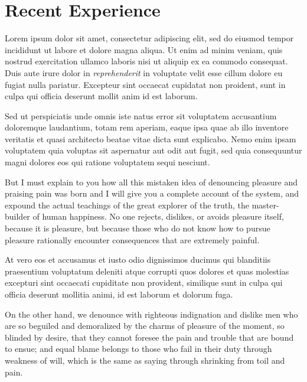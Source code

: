 \documentclass[]{resume}
\begin{document}
\begin{minipage}[t]{0.66\textwidth} 
	\section{Recent Experience} 
		Lorem ipsum dolor sit amet, consectetur adipiscing elit, sed do eiusmod tempor incididunt ut labore et dolore magna aliqua. Ut enim ad minim veniam, quis nostrud exercitation ullamco laboris nisi ut aliquip ex ea commodo consequat. Duis aute irure dolor in \textit{reprehenderit} in voluptate velit esse cillum dolore eu fugiat nulla pariatur. Excepteur sint occaecat cupidatat non proident, sunt in culpa qui officia deserunt mollit anim id est laborum.  \sectionsep
	
		Sed ut perspiciatis unde omnis iste natus error sit voluptatem accusantium doloremque laudantium, totam rem aperiam, eaque ipsa quae ab illo inventore veritatis et quasi architecto beatae vitae dicta sunt explicabo. Nemo enim ipsam voluptatem quia voluptas sit aspernatur aut odit aut fugit, sed quia consequuntur magni dolores eos qui ratione voluptatem sequi nesciunt. \sectionsep
	
		But I must explain to you how all this mistaken idea of denouncing pleasure and praising pain was born and I will give you a complete account of the system, and expound the actual teachings of the great explorer of the truth, the master-builder of human happiness. No one rejects, dislikes, or avoids pleasure itself, because it is pleasure, but because those who do not know how to pursue pleasure rationally encounter consequences that are extremely painful. \sectionsep
		
		At vero eos et accusamus et iusto odio dignissimos ducimus qui blanditiis praesentium voluptatum deleniti atque corrupti quos dolores et quas molestias excepturi sint occaecati cupiditate non provident, similique sunt in culpa qui officia deserunt mollitia animi, id est laborum et dolorum fuga. \sectionsep
		
		On the other hand, we denounce with righteous indignation and dislike men who are so beguiled and demoralized by the charms of pleasure of the moment, so blinded by desire, that they cannot foresee the pain and trouble that are bound to ensue; and equal blame belongs to those who fail in their duty through weakness of will, which is the same as saying through shrinking from toil and pain. \sectionsep 
		
\end{minipage} 
\vfill \vfill \vfill \vfill
\end{document}
